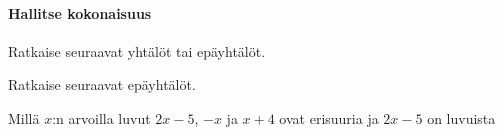 \begin{tehtavasivu}
\begin{tehtava}
\begin{vastaus}
	\end{vastaus}
\end{tehtava}



\paragraph*{Hallitse kokonaisuus}

\begin{tehtava}
    Ratkaise seuraavat yhtälöt tai epäyhtälöt.
    \begin{alakohdat}
    \end{alakohdat}
    \begin{vastaus}
        \begin{alakohdat}
        \end{alakohdat}
    \end{vastaus}
\end{tehtava}

\begin{tehtava}
    Ratkaise seuraavat epäyhtälöt.
    \begin{alakohdat}
    \end{alakohdat}
    \begin{vastaus}
        \begin{alakohdat}
        \end{alakohdat}
    \end{vastaus}
\end{tehtava}


\begin{tehtava}
	Millä $x$:n arvoilla luvut $2x - 5$, $-x$ ja $x + 4$ ovat erisuuria ja $2x - 5$ on luvuista
	\begin{alakohdat}
	\end{alakohdat}
	\begin{vastaus}
		\begin{alakohdat}
			\alakohta{$x > 9$}
			\alakohta{$\frac{5}{3} < x < 9$}
			\alakohta{$x < \frac{5}{3}$}
		\end{alakohdat}
	\end{vastaus}
\end{tehtava}


\end{tehtavasivu}
